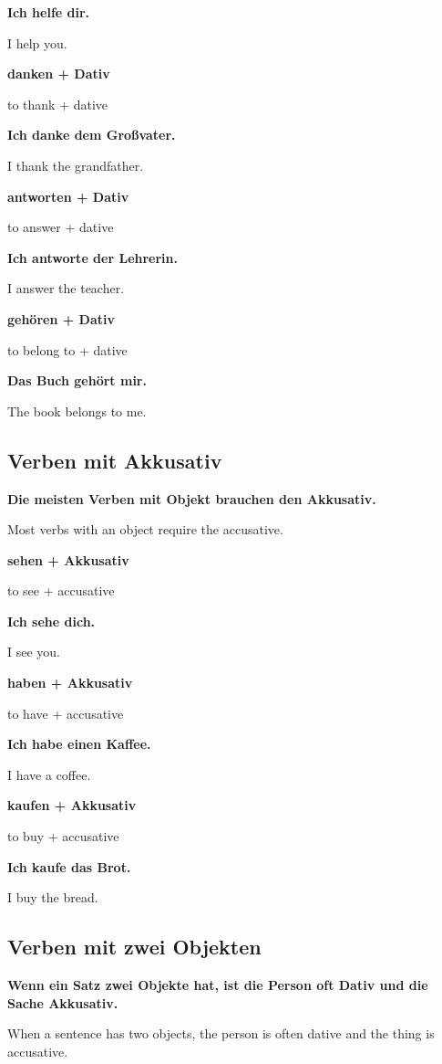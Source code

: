 \documentclass[a4paper]{article}
\newcommand{\EN}[1]{\par{\small\textcolor{TranslationGray}{#1}}\vspace{0.4em}}
\begin{document}
            \textbf{Ich helfe dir.}
            \EN{I help you.}
            
            \textbf{danken + Dativ}
            \EN{to thank + dative}
            
            \textbf{Ich danke dem Großvater.}
            \EN{I thank the grandfather.}
            
            \textbf{antworten + Dativ}
            \EN{to answer + dative}
            
            \textbf{Ich antworte der Lehrerin.}
            \EN{I answer the teacher.}
            
            \textbf{gehören + Dativ}
            \EN{to belong to + dative}
            
            \textbf{Das Buch gehört mir.}
            \EN{The book belongs to me.}
        
        \subsection{Verben mit Akkusativ}
            
            \textbf{Die meisten Verben mit Objekt brauchen den Akkusativ.}
            \EN{Most verbs with an object require the accusative.}
            
            \textbf{sehen + Akkusativ}
            \EN{to see + accusative}
            
            \textbf{Ich sehe dich.}
            \EN{I see you.}
            
            \textbf{haben + Akkusativ}
            \EN{to have + accusative}
            
            \textbf{Ich habe einen Kaffee.}
            \EN{I have a coffee.}
            
            \textbf{kaufen + Akkusativ}
            \EN{to buy + accusative}
            
            \textbf{Ich kaufe das Brot.}
            \EN{I buy the bread.}
        
        \subsection{Verben mit zwei Objekten}
            
            \textbf{Wenn ein Satz zwei Objekte hat, ist die Person oft Dativ und die Sache Akkusativ.}
            \EN{When a sentence has two objects, the person is often dative and the thing is accusative.}
            
\end{document}
